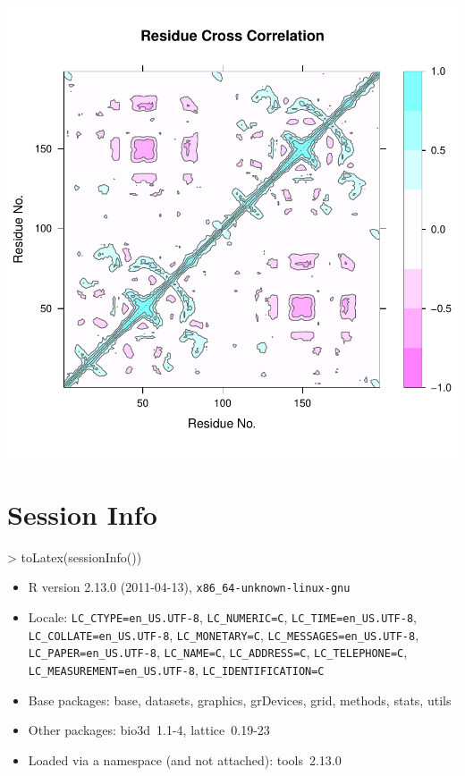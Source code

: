 \documentclass[letter]{article}
\begin{document}
\begin{Schunk}
\end{Schunk}
\includegraphics{Bio3D_trajectory-017}

\section*{Session Info}
\begin{Schunk}
\begin{Sinput}
> toLatex(sessionInfo())
\end{Sinput}
\begin{Soutput}
\begin{itemize}\raggedright
  \item R version 2.13.0 (2011-04-13), \verb|x86_64-unknown-linux-gnu|
  \item Locale: \verb|LC_CTYPE=en_US.UTF-8|, \verb|LC_NUMERIC=C|, \verb|LC_TIME=en_US.UTF-8|, \verb|LC_COLLATE=en_US.UTF-8|, \verb|LC_MONETARY=C|, \verb|LC_MESSAGES=en_US.UTF-8|, \verb|LC_PAPER=en_US.UTF-8|, \verb|LC_NAME=C|, \verb|LC_ADDRESS=C|, \verb|LC_TELEPHONE=C|, \verb|LC_MEASUREMENT=en_US.UTF-8|, \verb|LC_IDENTIFICATION=C|
  \item Base packages: base, datasets, graphics, grDevices, grid,
    methods, stats, utils
  \item Other packages: bio3d~1.1-4, lattice~0.19-23
  \item Loaded via a namespace (and not attached): tools~2.13.0
\end{itemize}
\end{Soutput}
\end{Schunk}
\end{document}

